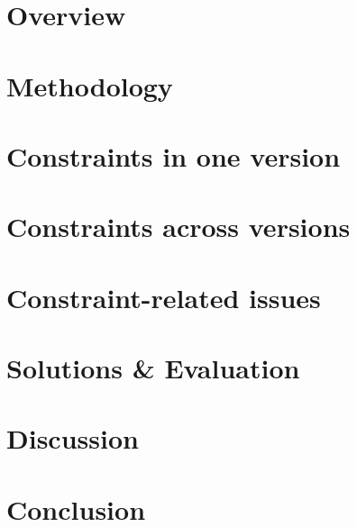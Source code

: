 \section{Overview}


\section{Methodology}
\label{sec:meth}



\section{Constraints in one version}
\label{sec:wherewhat}


\section{Constraints   across versions}
\label{sec:evolve}


\section{Constraint-related issues}
\label{sec:causes}


 \section{Solutions \& Evaluation}
\label{sec:solution}
 
 

\section{Discussion}
\label{sec:threats}




\section{Conclusion}

